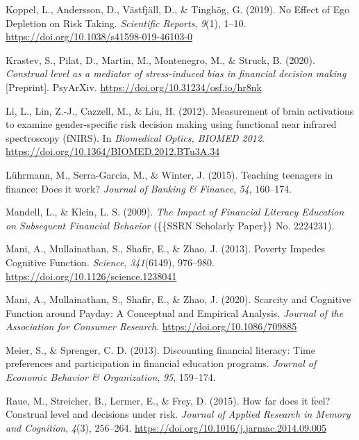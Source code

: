 \documentclass[
  letterpaper,
  DIV=11,
  numbers=noendperiod]{scrartcl}
\newlength{\cslhangindent}
\newlength{\cslentryspacingunit} %
\newenvironment{CSLReferences}[2] %
 {%
  \setlength{\parindent}{0pt}
  \ifodd #1
  \let\oldpar\par
  \def\par{\hangindent=\cslhangindent\oldpar}
  \fi
  \setlength{\parskip}{#2\cslentryspacingunit}
 }%
 {}
\begin{document}
\begin{CSLReferences}{1}{0}
\leavevmode{}%
Koppel, L., Andersson, D., Västfjäll, D., \& Tinghög, G. (2019). No
{Effect} of {Ego Depletion} on {Risk Taking}. \emph{Scientific Reports},
\emph{9}(1), 1--10. \url{https://doi.org/10.1038/s41598-019-46103-0}

\leavevmode{}%
Krastev, S., Pilat, D., Martin, M., Montenegro, M., \& Struck, B.
(2020). \emph{Construal level as a mediator of stress-induced bias in
financial decision making} {[}Preprint{]}. {PsyArXiv}.
\url{https://doi.org/10.31234/osf.io/hr8nk}

\leavevmode{}%
Li, L., Lin, Z.-J., Cazzell, M., \& Liu, H. (2012). Measurement of brain
activations to examine gender-specific risk decision making using
functional near infrared spectroscopy ({fNIRS}). In \emph{Biomedical
Optics, BIOMED 2012}. \url{https://doi.org/10.1364/BIOMED.2012.BTu3A.34}

\leavevmode{}%
Lührmann, M., Serra-Garcia, M., \& Winter, J. (2015). Teaching teenagers
in finance: {Does} it work? \emph{Journal of Banking \& Finance},
\emph{54}, 160--174.

\leavevmode{}%
Mandell, L., \& Klein, L. S. (2009). \emph{The {Impact} of {Financial
Literacy Education} on {Subsequent Financial Behavior}} (\{\{SSRN
Scholarly Paper\}\} No. 2224231).

\leavevmode{}%
Mani, A., Mullainathan, S., Shafir, E., \& Zhao, J. (2013). Poverty
{Impedes Cognitive Function}. \emph{Science}, \emph{341}(6149),
976--980. \url{https://doi.org/10.1126/science.1238041}

\leavevmode{}%
Mani, A., Mullainathan, S., Shafir, E., \& Zhao, J. (2020). Scarcity and
{Cognitive Function} around {Payday}: {A Conceptual} and {Empirical
Analysis}. \emph{Journal of the Association for Consumer Research}.
\url{https://doi.org/10.1086/709885}

\leavevmode{}%
Meier, S., \& Sprenger, C. D. (2013). Discounting financial literacy:
{Time} preferences and participation in financial education programs.
\emph{Journal of Economic Behavior \& Organization}, \emph{95},
159--174.

\leavevmode{}%
Raue, M., Streicher, B., Lermer, E., \& Frey, D. (2015). How far does it
feel? {Construal} level and decisions under risk. \emph{Journal of
Applied Research in Memory and Cognition}, \emph{4}(3), 256--264.
\url{https://doi.org/10.1016/j.jarmac.2014.09.005}


\end{CSLReferences}
\end{document}
